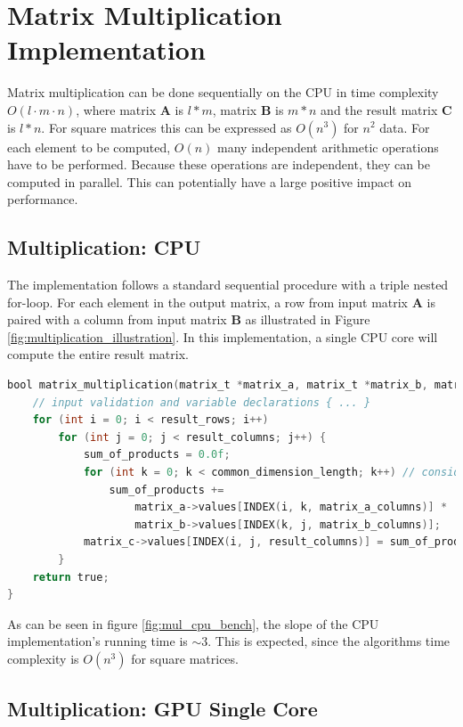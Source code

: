 \section{Matrix Multiplication Implementation}

Matrix multiplication can be done sequentially on the CPU in time complexity $O(l \cdot m \cdot n)$, where matrix $\mathbf{A}$ is $l*m$, matrix $\mathbf{B}$ is $m*n$ and the result matrix $\mathbf{C}$ is $l*n$. For square matrices this can be expressed as $O(n^3)$ for $n^2$ data. For each element to be computed, $O(n)$ many independent arithmetic operations have to be performed. Because these operations are independent, they can be computed in parallel. This can potentially have a large positive impact on performance.

\subsection{Multiplication: CPU}

The implementation follows a standard sequential procedure with a triple nested for-loop. For each element in the output matrix, a row from input matrix $\mathbf{A}$ is paired with a column from input matrix $\mathbf{B}$ as illustrated in Figure \ref{fig:multiplication_illustration}.  In this implementation, a single CPU core will compute the entire result matrix.

\begin{lstlisting}[language=C, caption={Matrix Multiplication on the CPU}, label={lst:matrix_multiplication_cpu}]
bool matrix_multiplication(matrix_t *matrix_a, matrix_t *matrix_b, matrix_t *matrix_c) {
    // input validation and variable declarations { ... }
    for (int i = 0; i < result_rows; i++)
        for (int j = 0; j < result_columns; j++) {
            sum_of_products = 0.0f;
            for (int k = 0; k < common_dimension_length; k++) // consider renaming to m
                sum_of_products +=
                    matrix_a->values[INDEX(i, k, matrix_a_columns)] *
                    matrix_b->values[INDEX(k, j, matrix_b_columns)];
            matrix_c->values[INDEX(i, j, result_columns)] = sum_of_products;
        }
    return true;
}
\end{lstlisting}

As can be seen in figure \ref{fig:mul_cpu_bench}, the slope of the CPU implementation's running time is $\sim 3$. This is expected, since the algorithms time complexity is $O(n^3)$ for square matrices.

\subsection{Multiplication: GPU Single Core}

